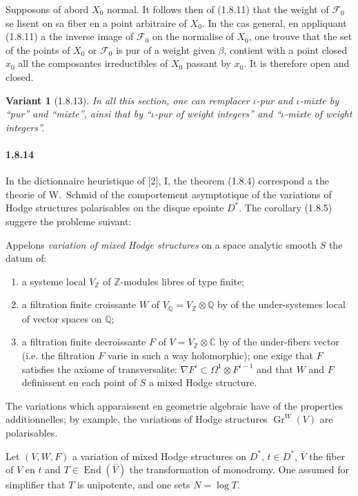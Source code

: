 \documentclass[12pt,a4paper]{article}
\theoremstyle{plain}
\newtheorem{variante}[theorem]{Variant}
\theoremstyle{definition}
\theoremstyle{remark}
\DeclareMathOperator{\End}{End}
\DeclareMathOperator{\Gr}{Gr}
\newcommand{\CC}{{\mathbb{C}}}
\newcommand{\QQ}{{\mathbb{Q}}}
\newcommand{\ZZ}{{\mathbb{Z}}}
\begin{document}
Supposons of abord $X_0$ normal. It follows then of (1.8.11) that the weight of $\mathscr{F}_0$ se lisent on sa fiber en a point arbitraire of $X_0$. In the cas general, en appliquant (1.8.11) a the inverse image of $\mathscr{F}_0$ on the normalise of $X_0$, one trouve that the set of the points of $X_0$ or $\mathscr{F}_0$ is pur of a weight given $\beta$, contient with a point closed $x_0$ all the composantes irreductibles of $X_0$ passant by $x_0$. It is therefore open and closed.

\begin{variante}[1.8.13]
In all this section, one can remplacer $\iota$-pur and $\iota$-mixte by ``pur'' and ``mixte'', ainsi that by ``$\iota$-pur of weight integers'' and ``$\iota$-mixte of weight integers''.
\end{variante}

\paragraph{1.8.14}
In the dictionnaire heuristique of [2], I, the theorem (1.8.4) correspond a the theorie of W.~Schmid of the comportement asymptotique of the variations of Hodge structures polarisables on the disque epointe $D^*$. The corollary (1.8.5) suggere the probleme suivant:

Appelons \emph{variation of mixed Hodge structures} on a space analytic smooth $S$ the datum of:
\begin{enumerate}[label=\alph*)]
\item a systeme local $V_\ZZ$ of $\ZZ$-modules libres of type finite;
\item a filtration finite croissante $W$ of $V_\QQ = V_\ZZ \otimes \QQ$ by of the under-systemes local of vector spaces on $\QQ$;
\item a filtration finite decroissante $F$ of $V = V_\ZZ \otimes \CC$ by of the under-fibers vector (i.e. the filtration $F$ varie in such a way holomorphic); one exige that $F$ satisfies the axiome of transversalite: $\nabla F^i \subset \Omega^1 \otimes F^{i-1}$ and that $W$ and $F$ definissent en each point of $S$ a mixed Hodge structure.
\end{enumerate}
The variations which apparaissent en geometrie algebraic have of the properties additionnelles; by example, the variations of Hodge structures $\Gr^W(V)$ are polarisables.

Let $(V, W, F)$ a variation of mixed Hodge structures on $D^*$, $t \in D^*$, $\overline{V}$ the fiber of $V$ en $t$ and $T \in \End(\overline{V})$ the transformation of monodromy. One assumed for simplifier that $T$ is unipotente, and one sets $N = \log T$.
\end{document}
